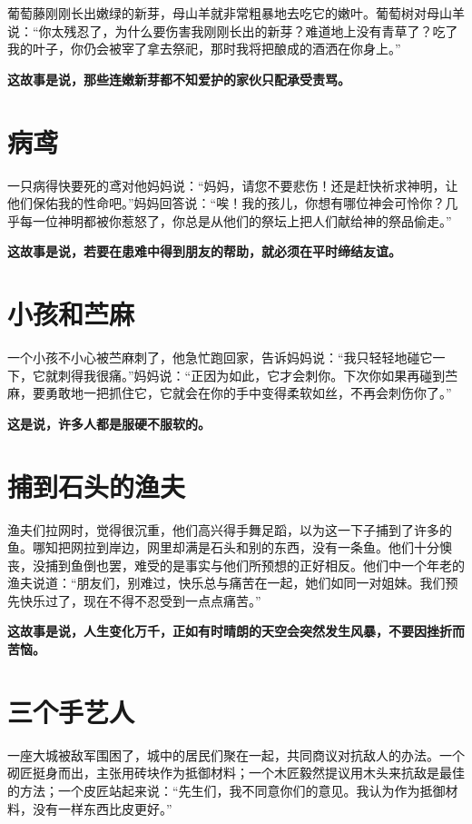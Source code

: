 葡萄藤刚刚长出嫩绿的新芽，母山羊就非常粗暴地去吃它的嫩叶。葡萄树对母山羊说：“你太残忍了，为什么要伤害我刚刚长出的新芽？难道地上没有青草了？吃了我的叶子，你仍会被宰了拿去祭祀，那时我将把酿成的酒洒在你身上。”

{\bfseries \color{red}这故事是说，那些连嫩新芽都不知爱护的家伙只配承受责骂。}

\section{病鸢}

一只病得快要死的鸢对他妈妈说：“妈妈，请您不要悲伤！还是赶快祈求神明，让他们保佑我的性命吧。”妈妈回答说：“唉！我的孩儿，你想有哪位神会可怜你？几乎每一位神明都被你惹怒了，你总是从他们的祭坛上把人们献给神的祭品偷走。”

{\bfseries \color{red}这故事是说，若要在患难中得到朋友的帮助，就必须在平时缔结友谊。}

\section{小孩和苎麻}

一个小孩不小心被苎麻刺了，他急忙跑回家，告诉妈妈说：“我只轻轻地碰它一下，它就刺得我很痛。”妈妈说：“正因为如此，它才会刺你。下次你如果再碰到苎麻，要勇敢地一把抓住它，它就会在你的手中变得柔软如丝，不再会刺伤你了。”

{\bfseries \color{red}这是说，许多人都是服硬不服软的。}

\section{捕到石头的渔夫}

渔夫们拉网时，觉得很沉重，他们高兴得手舞足蹈，以为这一下子捕到了许多的鱼。哪知把网拉到岸边，网里却满是石头和别的东西，没有一条鱼。他们十分懊丧，没捕到鱼倒也罢，难受的是事实与他们所预想的正好相反。他们中一个年老的渔夫说道：“朋友们，别难过，快乐总与痛苦在一起，她们如同一对姐妹。我们预先快乐过了，现在不得不忍受到一点点痛苦。”

{\bfseries \color{red}这故事是说，人生变化万千，正如有时晴朗的天空会突然发生风暴，不要因挫折而苦恼。}

\section{三个手艺人}

一座大城被敌军围困了，城中的居民们聚在一起，共同商议对抗敌人的办法。一个砌匠挺身而出，主张用砖块作为抵御材料；一个木匠毅然提议用木头来抗敌是最佳的方法；一个皮匠站起来说：“先生们，我不同意你们的意见。我认为作为抵御材料，没有一样东西比皮更好。”

